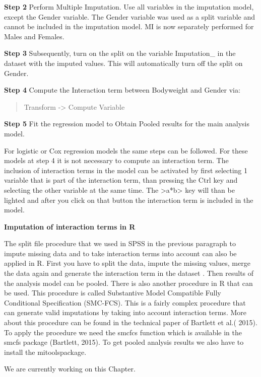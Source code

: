 \documentclass[
]{book}
\begin{document}
\textbf{Step 2} Perform Multiple Imputation. Use all variables in the
imputation model, except the Gender variable. The Gender variable was
used as a split variable and cannot be included in the imputation model.
MI is now separately performed for Males and Females.

\textbf{Step 3} Subsequently, turn on the split on the variable
Imputation\_ in the dataset with the imputed values. This will
automatically turn off the split on Gender.

\textbf{Step 4} Compute the Interaction term between Bodyweight and
Gender via:

\begin{quote}
Transform -\textgreater{} Compute Variable
\end{quote}

\textbf{Step 5} Fit the regression model to Obtain Pooled results for
the main analysis model.

For logistic or Cox regression models the same steps can be followed.
For these models at step 4 it is not necessary to compute an interaction
term. The inclusion of interaction terms in the model can be activated
by first selecting 1 variable that is part of the interaction term, than
pressing the Ctrl key and selecting the other variable at the same time.
The \textgreater a*b\textgreater{} key will than be lighted and after
you click on that button the interaction term is included in the model.

\textbf{Imputation of interaction terms in R}

The split file procedure that we used in SPSS in the previous paragraph
to impute missing data and to take interaction terms into account can
also be applied in R. First you have to split the data, impute the
missing values, merge the data again and generate the interaction term
in the dataset . Then results of the analysis model can be pooled. There
is also another procedure in R that can be used. This procedure is
called Substantive Model Compatible Fully Conditional Specification
(SMC-FCS). This is a fairly complex procedure that can generate valid
imputations by taking into account interaction terms. More about this
procedure can be found in the technical paper of Bartlett et al.( 2015).
To apply the procedure we need the smcfcs function which is available in
the smcfs package (Bartlett, 2015). To get pooled analysis results we
also have to install the mitoolspackage.

We are currently working on this Chapter.
\end{document}
